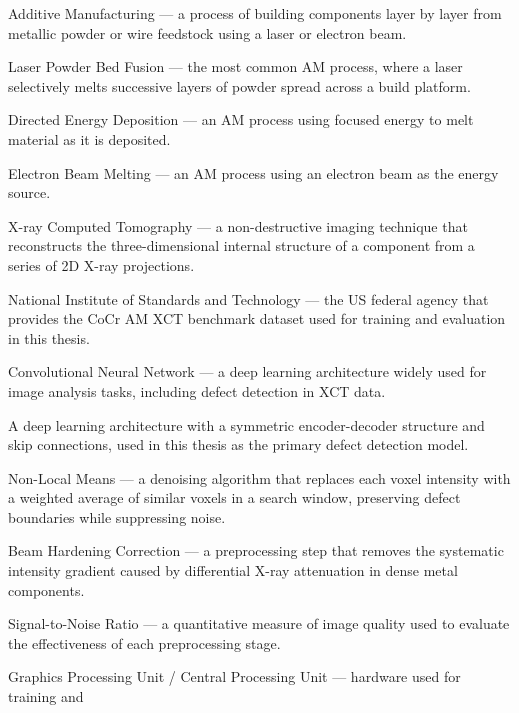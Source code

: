 
\begin{description}[leftmargin=2.6cm, style=nextline]
\item[AM] Additive Manufacturing --- a process of building components layer by layer from metallic
  powder or wire feedstock using a laser or electron beam.
\item[LPBF] Laser Powder Bed Fusion --- the most common AM process, where a laser selectively melts
  successive layers of powder spread across a build platform.
\item[DED] Directed Energy Deposition --- an AM process using focused energy to melt material as it
  is deposited.
\item[EBM] Electron Beam Melting --- an AM process using an electron beam as the energy source.
\item[XCT] X-ray Computed Tomography --- a non-destructive imaging technique that reconstructs the
  three-dimensional internal structure of a component from a series of 2D X-ray projections.
\item[NIST] National Institute of Standards and Technology --- the US federal agency that provides
  the CoCr AM XCT benchmark dataset used for training and evaluation in this thesis.
\item[CNN] Convolutional Neural Network --- a deep learning architecture widely used for image
  analysis tasks, including defect detection in XCT data.
\item[U-Net] A deep learning architecture with a symmetric encoder-decoder structure and skip
  connections, used in this thesis as the primary defect detection model.
\item[NLM] Non-Local Means --- a denoising algorithm that replaces each voxel intensity with a
  weighted average of similar voxels in a search window, preserving defect boundaries while
  suppressing noise.
\item[BHC] Beam Hardening Correction --- a preprocessing step that removes the systematic intensity
  gradient caused by differential X-ray attenuation in dense metal components.
\item[SNR] Signal-to-Noise Ratio --- a quantitative measure of image quality used to evaluate the
  effectiveness of each preprocessing stage.
\item[GPU/CPU] Graphics Processing Unit / Central Processing Unit --- hardware used for training and

\end{description}

